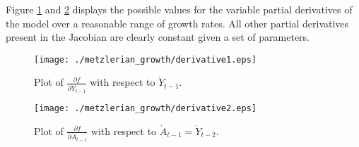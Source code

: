 Figure \ref{metzlerian_growth-derivative1} and \ref{metzlerian_growth-derivative2} displays the possible values for the variable partial derivatives of the model over a reasonable range of growth rates. All other partial derivatives present in the Jacobian are clearly constant given a set of parameters.

\begin{figure}
    \centering
    \texttt{[image: ./metzlerian\_growth/derivative1.eps]}
    \caption{Plot of $\frac{\partial f}{\partial \dot Y_{t-1}}$ with respect to $\dot Y_{t-1}$.}
    \label{metzlerian_growth-derivative1}
\end{figure}

\begin{figure}
    \centering
    \texttt{[image: ./metzlerian\_growth/derivative2.eps]}
    \caption{Plot of $\frac{\partial f}{\partial \dot A_{t-1}}$ with respect to $\dot A_{t-1}=\dot Y_{t-2}$.}
    \label{metzlerian_growth-derivative2}
\end{figure}

